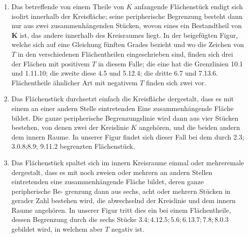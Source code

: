 \documentclass[twoside,12pt, showframe]{memoir}
\begin{document}
\begin{enumerate}
  \item Das betreffende von einem Theile von \(K\) anfangende Flächenstück endigt sich isolirt innerhalb der Kreisfläche; seine peripherische Begrenzung besteht dann nur aus zwei zusammenhängenden Stücken, wovon eines ein Bestandtheil von \(\boldsymbol{K}\) ist, das andere innerhalb des Kreisraumes liegt. In der beigefügten Figur, welche sich auf eine Gleichung fünften Grades bezieht und wo die Zeichen von \(T\) in den verschiedenen Flächentheilen eingeschrieben sind, finden sich drei der Flächen mit positivem \(T\) in diesem Falle; die eine hat die Grenzlinien 10.1 und 1.11.10; die zweite diese 4.5 und 5.12.4; die dritte 6.7 und 7.13.6. Flächentheile ähnlicher Art mit negativem \(T\) finden sich zwei vor.

  \item Das Flächenstück durchsetzt einfach die Kreisfläche dergestalt, dass es mit einem an einer andern Stelle eintretenden Eine zusammenhängende Fläche bildet. Die ganze peripherische Begrenzungslinie wird dann aus vier Stücken bestehen, von denen zwei der Kreislinie \(K\) angehören, und die beiden andern dem innern Raume. In unserer Figur findet sich dieser Fall bei dem durch 2.3; 3.0.8;8.9; 9.11.2 begrenzten Flächenstück.

  \item Das Flächenstück spaltet sich im innern Kreisraume einmal oder mehreremale dergestalt, dass es mit noch zweien oder mehrern an andern Stellen eintretenden eine zusammenhängende Fläche bildet, deren ganze peripherische Be-
grenzung dann aus sechs, acht oder mehrern Stücken in gerader Zahl bestehen wird, die abwechselnd der Kreislinie und dem innern Raume angehören. In unserer Figur tritt dies ein bei einem Flächentheile, dessen Begrenzung durch die sechs Stücke \(3.4 ; 4.12 .5 ; 5.6 ; 6.13 .7 ; 7.8 ; 8.0 .3\) gebildet wird, in welchem aber \(T\) negativ ist.

\end{enumerate}
\end{document}
